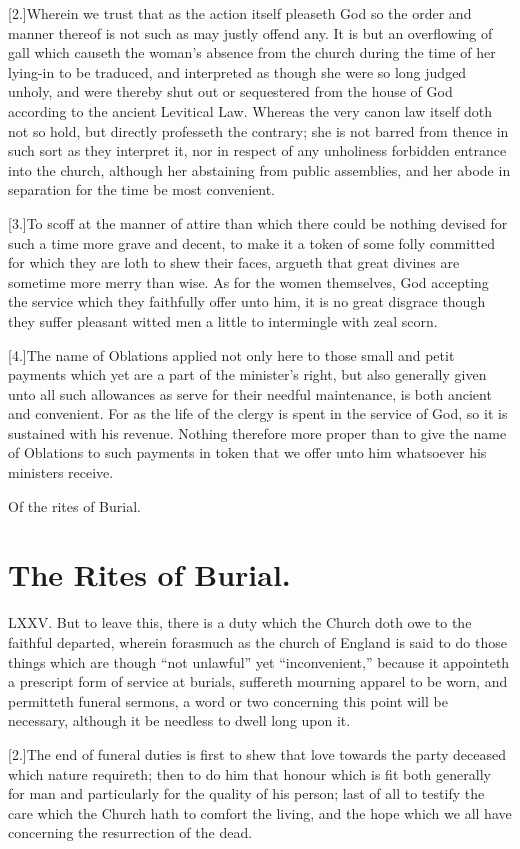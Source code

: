[2.]Wherein we trust that as the action itself pleaseth God so the order and manner thereof is not such as may justly offend any. It is but an overflowing of gall which causeth the woman’s absence from the church during the time of her lying-in to be traduced, and interpreted as though  she were so long judged unholy, and were thereby shut out or sequestered from the house of God according to the ancient Levitical Law. Whereas the very canon law itself doth not so hold, but directly professeth the contrary; she is not barred from thence in such sort as they interpret it, nor in respect of any unholiness forbidden entrance into the church, although her abstaining from public  assemblies,
 and her abode in separation for the time be most convenient.

[3.]To scoff at the manner of attire than which there could be nothing devised for such a time more grave and decent, to make it a token of some folly committed for which they are loth to shew their faces, argueth that great divines are sometime more merry than wise. As for the women themselves, God accepting the service which they faithfully offer unto him, it is no great disgrace though they suffer pleasant witted men a little to intermingle with zeal scorn.

[4.]The name of Oblations applied not only here to those small and petit payments which yet are a part of the minister’s  right,
 but also generally given unto all such allowances as serve for their needful maintenance, is both ancient and convenient. For as the life of the clergy is spent in the service of God, so it is sustained with his revenue. Nothing therefore more proper than to give the name of Oblations to such payments in token that we offer unto him whatsoever his ministers receive.


Of the rites of Burial.
\section*{The Rites of Burial.}
LXXV. But to leave this, there is a duty which the Church doth owe to the faithful departed, wherein forasmuch as the church of England is said to do those things which are though “not unlawful” yet “inconvenient,” because it appointeth a prescript form of service at burials, suffereth mourning apparel to be worn, and permitteth funeral sermons, a word or two concerning this point will be necessary, although it be needless to dwell long upon it.

[2.]The end of funeral duties is first to shew that love towards the party deceased which nature requireth; then to do him that honour which is fit both generally for man and particularly for the quality of his person; last of all to testify the care which the Church hath to comfort the living, and the hope which we all have concerning the resurrection of the dead.

